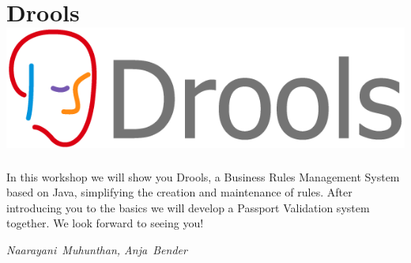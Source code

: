 \section*{Drools\hfill\includegraphics[width=.35\linewidth]{images/drools_logo_600px.png}}

In this workshop we will show you Drools, a Business Rules Management System based on Java, simplifying the creation and maintenance of rules. After introducing you to the basics we will develop a Passport Validation system together. We look forward to seeing you! 

\hfill\textit{Naarayani~Muhunthan, Anja~Bender}
